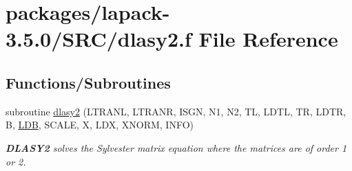 \hypertarget{dlasy2_8f}{}\section{packages/lapack-\/3.5.0/\+S\+R\+C/dlasy2.f File Reference}
\label{dlasy2_8f}
\subsection*{Functions/\+Subroutines}
\begin{DoxyCompactItemize}
\item 
subroutine \hyperlink{group__doubleSYauxiliary_gaf104dd54134c1a4ddb0d573ff9fe6d06}{dlasy2} (L\+T\+R\+A\+N\+L, L\+T\+R\+A\+N\+R, I\+S\+G\+N, N1, N2, T\+L, L\+D\+T\+L, T\+R, L\+D\+T\+R, B, \hyperlink{example__user_8c_a50e90a7104df172b5a89a06c47fcca04}{L\+D\+B}, S\+C\+A\+L\+E, X, L\+D\+X, X\+N\+O\+R\+M, I\+N\+F\+O)
\begin{DoxyCompactList}\small\item\em {\bfseries D\+L\+A\+S\+Y2} solves the Sylvester matrix equation where the matrices are of order 1 or 2. \end{DoxyCompactList}\end{DoxyCompactItemize}
